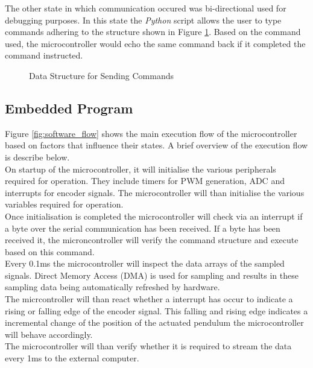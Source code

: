 The other state in which communication occured was bi-directional used for debugging purposes. In this state the \textit{Python} script allows the user to type commands adhering to the structure shown in Figure \ref{fig:uart_struct}. Based on the command used, the microcontroller would echo the same command back if it completed the command instructed.


\begin{figure}[h]
	\centering
	
	\caption{Data Structure for Sending Commands}
	\label{fig:uart_struct}
\end{figure}


\subsection{Embedded Program}


Figure \ref{fig:software_flow} shows the main execution flow of the microcontroller based on factors that influence their states. A brief overview of the execution flow is describe below.\\

On startup of the microcontroller, it will initialise the various peripherals required for operation. They include timers for PWM generation, ADC and interrupts for encoder signals. The microcontroller will than initialise the various variables required for operation.\\

Once initialisation is completed the microcontroller will check via an interrupt if a byte over the serial communication has been received. If a byte has been received it, the microncontroller will verify the command structure and execute based on this command.\\

Every 0.1ms the microcontroller will inspect the data arrays of the sampled signals. Direct Memory Access (DMA) is used for sampling and results in these sampling data being automatically refreshed by hardware.\\

The micrcontroller will than react whether a interrupt has occur to indicate a rising or falling edge of the encoder signal. This falling and rising edge indicates a incremental change of the position of the actuated pendulum the microcontroller will behave accordingly.\\

The microcontroller will than verify whether it is required to stream the data every 1ms to the external computer. 
